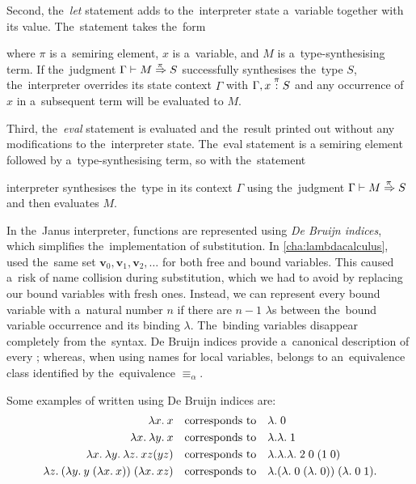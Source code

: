 Second, the~\emph{let} statement adds to the~interpreter state a~variable
together with its value. The~statement takes the~form
\begin{center}
\end{center}
where $\pi$ is a~semiring element, $x$ is a~variable, and $M$ is
a~type-synthesising term. If the~judgment $\Gamma \vdash M \overset{\!{\pi}}\Rightarrow S$
successfully synthesises the~type $S$, the~interpreter overrides its state
context $\Gamma$ with $\Gamma, x \overset{\pi}: S$ and any occurrence of $x$ in
a~subsequent term will be evaluated to $M$.

Third, the~\emph{eval} statement is evaluated and the~result printed out without
any modifications to the~interpreter state. The~eval statement is a semiring
element followed by a~type-synthesising term, so with the~statement
\begin{center}
\end{center}
interpreter synthesises the~type in its context $\Gamma$ using the~judgment
$\Gamma \vdash M \overset{\!{\pi}}\Rightarrow S$ and then evaluates $M$.


In the~Janus interpreter, functions are represented using
\emph{De Bruijn indices}, which simplifies the~implementation of substitution.
In \autoref{cha:lambdacalculus}, \lts used the~same set
$\mathbf{v}_0, \mathbf{v}_1, \mathbf{v}_2, \dots$ for both free and bound
variables. This caused a~risk of name collision during substitution, which we
had to avoid by replacing our bound variables with fresh ones. Instead, we can
represent every bound variable with a~natural number $n$ if there are $n-1$
$\lambda$s between the~bound variable occurrence and its binding $\lambda$.
The~binding variables disappear completely from the~syntax. De Bruijn indices
provide a~canonical description of every \lt; whereas, when using names for
local variables, \lt belongs to an~equivalence class identified by
the~equivalence $\equiv_\alpha$.

Some examples of \lts written using De Bruijn indices are:
\begin{align*}
  \lambda x . \: x \quad &\text{corresponds to} \quad \lambda. \; 0 \\
  \lambda x . \: \lambda y . \: x \quad &\text{corresponds to} \quad \lambda. \lambda. \; 1 \\
  \lambda x . \: \lambda y . \: \lambda z . \: x z (y z) \quad &\text{corresponds to} \quad
    \lambda. \lambda. \lambda. \; 2 \; 0 \; (1 \; 0) \\
  \lambda z . \: (\lambda y . \: y \; (\lambda x . \: x))\;(\lambda x . \: x z)\quad&\text{corresponds to}
    \quad \lambda. (\lambda. \; 0 \; (\lambda. \; 0)) \; (\lambda. \; 0 \; 1).
\end{align*}

